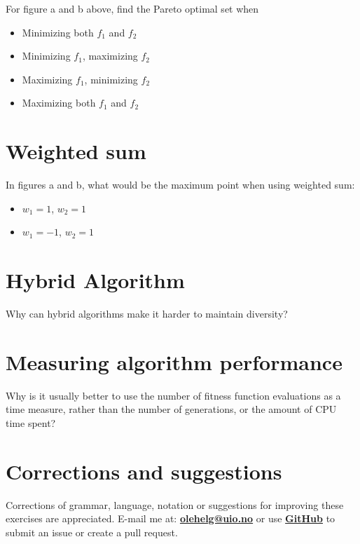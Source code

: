 \documentclass{article}           %
\begin{document}
For figure a and b above, find the Pareto optimal set when
\begin{itemize}
    \item Minimizing both \(f_1\) and \(f_2\)
    \item Minimizing \(f_1\), maximizing \(f_2\)
    \item Maximizing \(f_1\), minimizing \(f_2\)
    \item Maximizing both \(f_1\) and \(f_2\)
\end{itemize}
\section{Weighted sum}
In figures a and b, what would be the maximum point when using weighted sum:
\begin{itemize}
    \item \(w_1 = 1\),  \(w_2 = 1\)
    \item \(w_1 = -1\), \(w_2 = 1\)
\end{itemize}
\section{Hybrid Algorithm}
Why can hybrid algorithms make it harder to maintain diversity?
\section{Measuring algorithm performance}
Why is it usually better to use the number of fitness function evaluations as a
time measure, rather than the number of generations, or the amount of CPU
time spent?
\section*{Corrections and suggestions}
Corrections of grammar, language, notation or suggestions for improving these exercises are appreciated.
E-mail me at: \href{mailto:olehelg@uio.no}{\textbf{olehelg@uio.no}} or use
\href{https://github.com/olehermanse/INF3490-AI_Machine_Learning}{\textbf{GitHub}}
to submit an issue or create a pull request.
\end{document}
